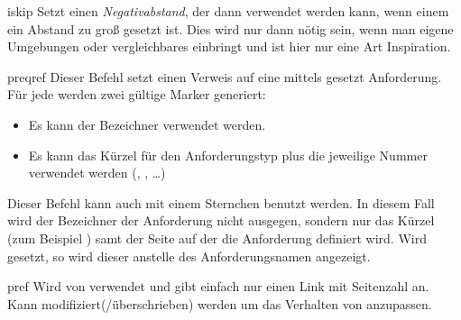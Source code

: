 \documentclass{sopra-base}
\begin{document}
\begin{command}{iskip}{}
    Setzt einen \emph{Negativabstand}, der dann verwendet werden kann, wenn einem ein Abstand zu groß gesetzt ist. Dies wird nur dann nötig sein, wenn man eigene Umgebungen oder vergleichbares einbringt und ist hier nur eine Art Inspiration.
\end{command}

\begin{command}{preqref}{}
    Dieser Befehl setzt einen Verweis auf eine mittels  gesetzt Anforderung. Für jede werden zwei gültige Marker generiert: \begin{itemize}\setlength{\itemsep}{0pt}
        \item Es kann der Bezeichner verwendet werden.
        \item Es kann das Kürzel für den Anforderungstyp plus die jeweilige Nummer verwendet werden (, , \ldots)
    \end{itemize}
    Dieser Befehl kann auch mit einem Sternchen benutzt werden. In diesem Fall wird der
    Bezeichner der Anforderung nicht ausgegen, sondern nur das Kürzel (zum Beispiel ) samt der Seite auf der die Anforderung definiert wird. Wird  gesetzt, so wird
    dieser anstelle des Anforderungsnamen angezeigt.
\end{command}

\begin{command}{pref}{}
    Wird von  verwendet und gibt einfach nur einen Link mit Seitenzahl an.
    Kann modifiziert(/überschrieben) werden um das Verhalten von  anzupassen.
\end{command}
\end{document}
